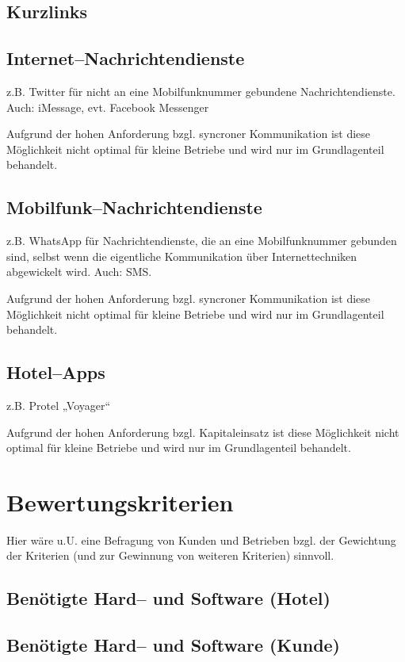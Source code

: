 \subsection{Kurzlinks}
\subsection{Internet--Nachrichtendienste}

z.B. Twitter für nicht an eine Mobilfunknummer gebundene Nachrichtendienste. Auch: iMessage, evt. Facebook Messenger

Aufgrund der hohen Anforderung bzgl. syncroner Kommunikation ist diese Möglichkeit nicht optimal für kleine Betriebe und wird nur im Grundlagenteil behandelt.

\subsection{Mobilfunk--Nachrichtendienste}

z.B. WhatsApp für Nachrichtendienste, die an eine Mobilfunknummer gebunden sind, selbst wenn die eigentliche Kommunikation über Internettechniken abgewickelt wird. Auch: SMS.

Aufgrund der hohen Anforderung bzgl. syncroner Kommunikation ist diese Möglichkeit nicht optimal für kleine Betriebe und wird nur im Grundlagenteil behandelt.

\subsection{Hotel--Apps}

z.B. Protel „Voyager“

Aufgrund der hohen Anforderung bzgl. Kapitaleinsatz ist diese Möglichkeit nicht optimal für kleine Betriebe und wird nur im Grundlagenteil behandelt.

\section{Bewertungskriterien}
\label{sec:kriterien}

Hier wäre u.U. eine Befragung von Kunden und Betrieben bzgl. der Gewichtung der Kriterien (und zur Gewinnung von weiteren Kriterien) sinnvoll.

\subsection{Benötigte Hard-- und Software (Hotel)}
\subsection{Benötigte Hard-- und Software (Kunde)}
